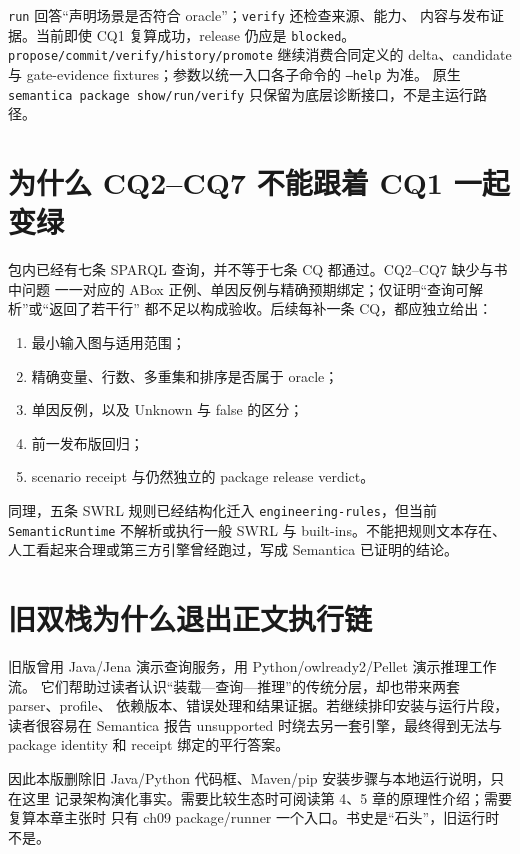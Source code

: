 \texttt{run} 回答“声明场景是否符合 oracle”；\texttt{verify} 还检查来源、能力、
内容与发布证据。当前即使 CQ1 复算成功，release 仍应是 \texttt{blocked}。
\texttt{propose/commit/verify/history/promote} 继续消费合同定义的 delta、candidate 与
gate-evidence fixtures；参数以统一入口各子命令的 \texttt{--help} 为准。
原生 \texttt{semantica package show/run/verify} 只保留为底层诊断接口，不是主运行路径。

\section{为什么 CQ2--CQ7 不能跟着 CQ1 一起变绿}

包内已经有七条 SPARQL 查询，并不等于七条 CQ 都通过。CQ2--CQ7 缺少与书中问题
一一对应的 ABox 正例、单因反例与精确预期绑定；仅证明“查询可解析”或“返回了若干行”
都不足以构成验收。后续每补一条 CQ，都应独立给出：

\begin{enumerate}
\item 最小输入图与适用范围；
\item 精确变量、行数、多重集和排序是否属于 oracle；
\item 单因反例，以及 Unknown 与 false 的区分；
\item 前一发布版回归；
\item scenario receipt 与仍然独立的 package release verdict。
\end{enumerate}

同理，五条 SWRL 规则已经结构化迁入 \texttt{engineering-rules}，但当前
\texttt{SemanticRuntime} 不解析或执行一般 SWRL 与 built-ins。不能把规则文本存在、
人工看起来合理或第三方引擎曾经跑过，写成 Semantica 已证明的结论。

\section{旧双栈为什么退出正文执行链}

旧版曾用 Java/Jena 演示查询服务，用 Python/owlready2/Pellet 演示推理工作流。
它们帮助过读者认识“装载—查询—推理”的传统分层，却也带来两套 parser、profile、
依赖版本、错误处理和结果证据。若继续排印安装与运行片段，读者很容易在 Semantica
报告 unsupported 时绕去另一套引擎，最终得到无法与 package identity 和 receipt
绑定的平行答案。

因此本版删除旧 Java/Python 代码框、Maven/pip 安装步骤与本地运行说明，只在这里
记录架构演化事实。需要比较生态时可阅读第 4、5 章的原理性介绍；需要复算本章主张时
只有 ch09 package/runner 一个入口。书史是“石头”，旧运行时不是。

